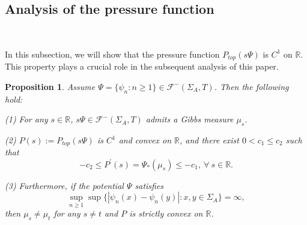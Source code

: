 \documentclass[reqno,11pt,graphicx,]{amsart}
\numberwithin{equation}{section}
\theoremstyle{plain}
\newcommand{\R}{{\mathbb R}}
\newcommand{\3}{\mathbf{3}}
\newtheorem{proposition}[theorem]{Proposition}
\begin{document}
	\subsection{Analysis of the pressure function}\
	
	In this subsection, we will show that the pressure function $P_{top}(s\Psi)$ is $C^1$ on $\R$. This property plays a crucial role in the subsequent analysis of this paper.
	
	\begin{proposition}\label{relatived-pressure-diff}
		Assume $\Psi=\{\psi_{n}:n\geq1\}\in\mathcal{F}^-(\Sigma_{A},T)$. Then the following hold:
		
		(1) For any $s\in\R$, $s\Psi\in\mathcal{F}^-(\Sigma_{A},T)$ admits a Gibbs measure $\mu_s$. 
		
		(2) $P(s):=P_{top}(s\Psi)$ is $C^1$ and convex on $\R$, and there exist $0<c_1\leq c_2$ such that 
		\begin{equation}\label{diff-Ly}
			-c_2\leq P^{\prime }(s)=\Psi_*(\mu_s)\leq-c_1,\ \forall\ s\in%
			{\mathbb{R}}.
		\end{equation}
		
		(3) Furthermore, if the potential $\Psi$ satisfies
		\begin{equation}\label{contract}
			\sup_{n\geq1}\sup\{|\psi_{n}(x)-\psi_{n}(y)|:x,y\in\Sigma_{A}\}=\infty,
		\end{equation}
		then $\mu_{s}\neq\mu_{t}$ for any $s\neq t$ and $P$ is strictly convex on $\R$.
	\end{proposition}
\end{document}
